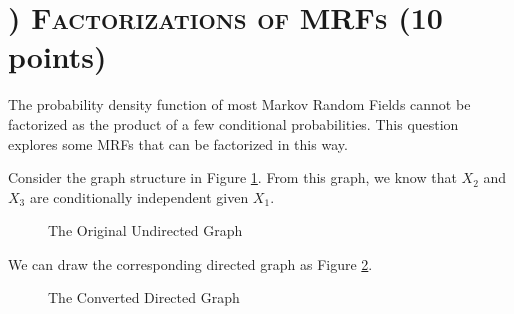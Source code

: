 \documentclass[11pt]{article}
\newcommand{\ztnodesize}{.6}
\newcounter{QuestionCounter}
\newcounter{SubQuestionCounter}[QuestionCounter]
\newcommand{\newquestion}{\stepcounter{QuestionCounter}\setcounter{SubQuestionCounter}{1}\newpage}
\begin{document}
\begin{answertext}{19 cm}{}

\end{answertext}


\newquestion
\section*{) \textsc{Factorizations of MRFs} (10 points) }
The probability density function of most Markov Random Fields cannot be factorized as the product of a few conditional probabilities. This question explores some MRFs that can be factorized in this way.

Consider the graph structure in Figure \ref{fig:utm1}. From this graph, we know that $X_2$ and $X_3$ are conditionally independent given $X_1$.
\begin{figure}[h]
    \begin{center}
        \caption{The Original Undirected Graph}
            \label{fig:utm1}
        \end{center}
\end{figure}

\noindent We can draw the corresponding directed graph as Figure \ref{fig:dtm2}.
\begin{figure}[h]
    \begin{center}
        \caption{The Converted Directed Graph}
            \label{fig:dtm2}
        \end{center}
\end{figure}
\end{document}
